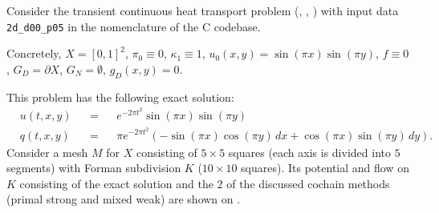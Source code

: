 \begin{example}
  Consider the transient continuous heat transport problem
  (,
   ,
   )
  with input data \verb|2d_d00_p05| in the nomenclature of the C codebase.

  Concretely,
    $X = [0, 1]^2$,
    $\pi_0 \equiv 0$,
    $\kappa_1 \equiv 1$,
    $u_0(x, y) = \sin(\pi x) \sin(\pi y)$,
    $f \equiv 0$,
    $G_D = \partial X$,
    $G_N = \emptyset$,
    $g_D(x, y) = 0$.

  This problem has the following exact solution:
  \begin{subequations}
    \begin{alignat}{3}
      & u(t, x, y) && = && e^{-2 \pi t^2} \sin(\pi x) \sin(\pi y) \\
      & q(t, x, y) && =
      && \pi e^{-2 \pi t^2}
         (-\sin(\pi x) \cos(\pi y)\, d x + \cos(\pi x) \sin(\pi y)\, d y).
    \end{alignat}
  \end{subequations}
  Consider a mesh $M$ for $X$ consisting of $5 \times 5$ squares (each axis is
  divided into $5$ segments) with Forman subdivision $K$
  ($10 \times 10$ squares).
  Its potential and flow on $K$ consisting of the exact solution and the $2$ of
  the discussed cochain methods (primal strong and mixed weak) are shown on
  .
\end{example}
